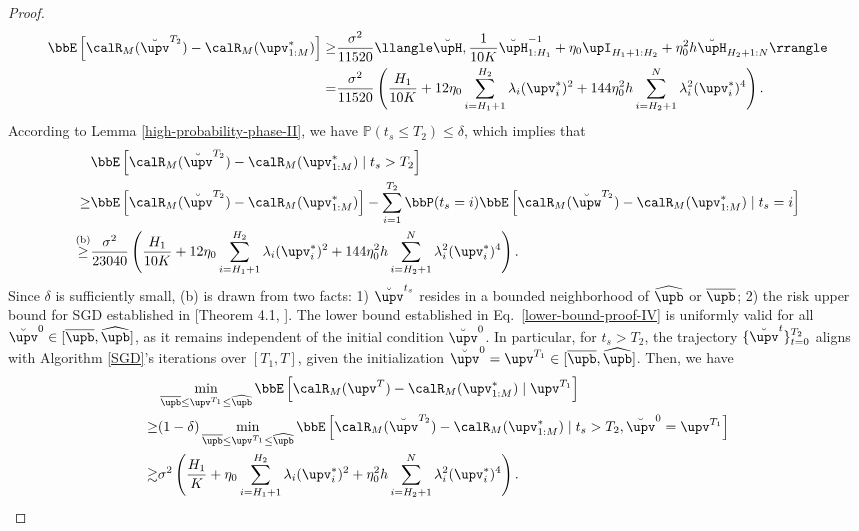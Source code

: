 \begin{proof}
\begin{align}
    \bbE\left[\calR_M(\breve{\upv}^{T_2})-\calR_M(\upv_{1:M}^*)\right]\geq&\frac{\sigma^2}{11520}\llangle\breve{\upH},\frac{1}{10K}\breve{\upH}_{1:H_1}^{-1}+\eta_0\upI_{H_1+1:H_2}+\eta_0^2h\breve{\upH}_{H_2+1:N}\rrangle\notag
    \\
    =&\frac{\sigma^2}{11520}\left(\frac{H_1}{10K}+12\eta_0\sum_{i=H_1+1}^{H_2}\lambda_i(\upv_i^*)^2+144\eta_0^2h\sum_{i=H_2+1}^{N}\lambda_i^2(\upv_i^*)^4\right).\notag
\end{align}
According to Lemma \ref{high-probability-phase-II}, we have $\mathbb{P}(t_s\leq T_2)\leq\delta$, which implies that 
\begin{align}\label{lower-bound-proof-IV}
    &\bbE\left[\calR_M(\breve{\upv}^{T_2})-\calR_M(\upv_{1:M}^*)\mid t_s>T_2\right]\notag
    \\
    \geq&\bbE\left[\calR_M(\breve{\upv}^{T_2})-\calR_M(\upv_{1:M}^*)\right]-\sum_{i=1}^{T_2}\bbP(t_s=i)\bbE\left[\calR_M(\breve{\upw}^{T_2})-\calR_M(\upv_{1:M}^*)\mid t_s=i\right]\notag
    \\
    \overset{\text{(b)}}{\geq}&\frac{\sigma^2}{23040}\left(\frac{H_1}{10K}+12\eta_0\sum_{i=H_1+1}^{H_2}\lambda_i(\upv_i^*)^2+144\eta_0^2h\sum_{i=H_2+1}^{N}\lambda_i^2(\upv_i^*)^4\right).
\end{align}
Since $\delta$ is sufficiently small, (b) is drawn from two facts: 1) $\breve{\upv}^{t_s}$ resides in a bounded neighborhood of $\widehat{\upb}$ or $\overline{\upb}$; 2) the risk upper bound for SGD established in [Theorem 4.1, \citet{wu2022last}]. The lower bound established in Eq.~\eqref{lower-bound-proof-IV} is uniformly valid for all $\breve{\upv}^0\in[\overline{\upb},\widehat{\upb}]$, as it remains independent of the initial condition $\breve{\upv}^0$. In particular, for $t_s > T_2$, the trajectory $\{\breve{\upv}^t\}_{t=0}^{T_2}$ aligns with Algorithm \ref{SGD}'s iterations over $[T_1, T]$, given the initialization $\breve{\upv}^0 = \upv^{T_1} \in [\overline{\upb}, \widehat{\upb}]$. Then, we have
\begin{align}\label{lower-bound-proof-V}
    &\min_{\overline{\upb}\leq\upv^{T_1}\leq\widehat{\upb}}\bbE\left[\calR_M(\upv^{T})-\calR_M(\upv_{1:M}^*)\mid \upv^{T_1}\right]\notag
    \\
    \geq&(1-\delta)\min_{\overline{\upb}\leq\upv^{T_1}\leq\widehat{\upb}}\bbE\left[\calR_M(\breve{\upv}^{T_2})-\calR_M(\upv_{1:M}^*)\mid t_s>T_2,\breve{\upv}^0 = \upv^{T_1}\right]\notag
    \\
    \gtrsim&\sigma^2\left(\frac{H_1}{K}+\eta_0\sum_{i=H_1+1}^{H_2}\lambda_i(\upv_i^*)^2+\eta_0^2h\sum_{i=H_2+1}^{N}\lambda_i^2(\upv_i^*)^4\right).

\end{align}
\end{proof}
